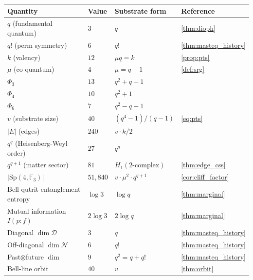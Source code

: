 ﻿\documentclass[12pt]{article}
\newcommand{\Sp}{\mathrm{Sp}}
\newcommand{\GF}[1]{\mathbb{F}_{#1}}
\begin{document}
\begin{center}\small
\begin{tabular}{l l l l}
\toprule
\textbf{Quantity} & \textbf{Value} & \textbf{Substrate form} & \textbf{Reference} \\
\midrule
$q$ (fundamental quantum)         & $3$       & $q$                       & \cref{thm:dioph} \\
$q!$ (perm symmetry)              & $6$       & $q!$                      & \cref{thm:masteq_history} \\
$k$ (valency)                     & $12$      & $\mu q = k$               & \cref{prop:pts} \\
$\mu$ (co-quantum)                & $4$       & $\mu = q + 1$             & \cref{def:srg} \\
$\Phi_3$                          & $13$      & $q^2 + q + 1$             & \\
$\Phi_4$                          & $10$      & $q^2 + 1$                 & \\
$\Phi_6$                          & $7$       & $q^2 - q + 1$             & \\
$v$ (substrate size)              & $40$      & $(q^4-1)/(q-1)$           & \eqref{eq:pts} \\
$|E|$ (edges)                     & $240$     & $v \cdot k / 2$           & \\
$q^q$ (Heisenberg-Weyl order)     & $27$      & $q^q$                     & \\
$q^{q+1}$ (matter sector)         & $81$      & $H_1(2\text{-complex})$   & \cref{thm:edge_css} \\
$|\Sp(4,\GF{3})|$                 & $51{,}840$ & $v\cdot\mu^2\cdot q^{q+1}$ & \cref{cor:cliff_factor} \\
\midrule
Bell qutrit entanglement entropy  & $\log 3$  & $\log q$                  & \cref{thm:marginal} \\
Mutual information $I(p:f)$       & $2\log 3$ & $2\log q$                 & \cref{thm:marginal} \\
Diagonal $\dim\mathcal D$         & $3$       & $q$                       & \cref{thm:masteq_history} \\
Off-diagonal $\dim\mathcal N$     & $6$       & $q!$                      & \cref{thm:masteq_history} \\
Past$\otimes$future $\dim$        & $9$       & $q^2 = q + q!$            & \cref{thm:masteq_history} \\
Bell-line orbit                   & $40$      & $v$                       & \cref{thm:orbit} \\

\end{tabular}
\end{center}
\end{document}
